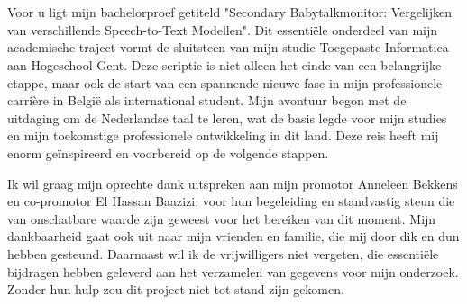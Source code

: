 
\chapter*{}%
\label{ch:voorwoord}







Voor u ligt mijn bachelorproef getiteld "Secondary Babytalkmonitor: Vergelijken van verschillende Speech-to-Text Modellen". Dit essentiële onderdeel van mijn academische traject vormt de sluitsteen van mijn studie Toegepaste Informatica aan Hogeschool Gent. Deze scriptie is niet alleen het einde van een belangrijke etappe, maar ook de start van een spannende nieuwe fase in mijn professionele carrière in België als international student. Mijn avontuur begon met de uitdaging om de Nederlandse taal te leren, wat de basis legde voor mijn studies en mijn toekomstige professionele ontwikkeling in dit land. Deze reis heeft mij enorm geïnspireerd en voorbereid op de volgende stappen.

Ik wil graag mijn oprechte dank uitspreken aan mijn promotor Anneleen Bekkens en co-promotor El Hassan Baazizi,  voor hun begeleiding en standvastig steun die van onschatbare waarde zijn geweest voor het bereiken van dit moment. Mijn dankbaarheid gaat ook uit naar mijn vrienden en familie, die mij door dik en dun hebben gesteund. Daarnaast wil ik de vrijwilligers niet vergeten, die essentiële bijdragen hebben geleverd aan het verzamelen van gegevens voor mijn onderzoek. Zonder hun hulp zou dit project niet tot stand zijn gekomen.

